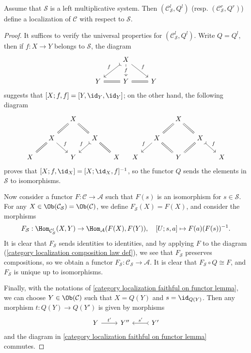 \begin{theorem}
Assume that $\mathcal{S}$ is a left multiplicative system. Then $(\mathcal{C}_\mathcal{S}^l,Q^l)$ (resp. $(\mathcal{C}_\mathcal{S}^r,Q^r)$) define a localization of $\mathcal{C}$ with respect to $\mathcal{S}$.
\end{theorem}
\begin{proof}
It suffices to verify the universal properties for $(\mathcal{C}_\mathcal{S}^l,Q^l)$. Write $Q=Q^l$, then if $f:X\to Y$ belongs to $\mathcal{S}$, the diagram
\[\begin{tikzcd}
&X\ar[ld,swap,"f",tail]\ar[d,"f"description]\ar[rd,"f"]&\\
Y\ar[r,equal]&Y\ar[r,equal]&Y
\end{tikzcd}\]
suggests that $[X;f,f]=[Y,\id_Y,\id_Y]$; on the other hand, the following diagram
\[\begin{tikzcd}[row sep=5mm, column sep=5mm]
&&X\ar[rd,equal]\ar[ld,equal]&&\\
&X\ar[ld,equal]\ar[rd,"f"]&&X\ar[ld,swap,"f",tail]\ar[rd,equal]&\\
X&&Y&&X
\end{tikzcd}\quad 
\begin{tikzcd}[row sep=5mm, column sep=5mm]
&&X\ar[rd,equal]\ar[ld,equal]&&\\
&X\ar[rd,equal]\ar[ld,swap,"f"]&&X\ar[rd,"f",tail]\ar[ld,equal]&\\
X&&Y&&X
\end{tikzcd}
\]
proves that $[X;f,\id_X]=[X;\id_X,f]^{-1}$, so the functor $Q$ sends the elements in $\mathcal{S}$ to isomorphisms.\par
Now consider a functor $F:\mathcal{C}\to\mathcal{A}$ such that $F(s)$ is an isomorphism for $s\in\mathcal{S}$. For any $X\in\Ob(\mathcal{C}_\mathcal{S})=\Ob(\mathcal{C})$, we define $F_\mathcal{S}(X)=F(X)$, and consider the morphisms
\begin{align*}
F_\mathcal{S}:\Hom_{\mathcal{C}_\mathcal{S}^l}(X,Y)\to \Hom_\mathcal{A}(F(X),F(Y)),\quad [U;s,a]\mapsto F(a)(F(s))^{-1}.
\end{align*}
It is clear that $F_\mathcal{S}$ sends identities to identities, and by applying $F$ to the diagram (\ref{category localization composition law def}), we see that $F_\mathcal{S}$ preserves compositions, so we obtain a functor $F_\mathcal{S}:\mathcal{C}_\mathcal{S}\to\mathcal{A}$. It is clear that $F_\mathcal{S}\circ Q\cong F$, and $F_\mathcal{S}$ is unique up to isomorphisms.\par
Finally, with the notations of \cref{category localization faithful on functor lemma}, we can choose $Y\in\Ob(\mathcal{C})$ such that $X=Q(Y)$ and $s=\id_{Q(Y)}$. Then any morphism $t:Q(Y)\to Q(Y')$ is given by morphisms
\[\begin{tikzcd}
Y\ar[r,"t'"]&Y''&Y'\ar[l,swap,"s'",tail]
\end{tikzcd}\]
and the diagram in \cref{category localization faithful on functor lemma} commutes.
\end{proof}

